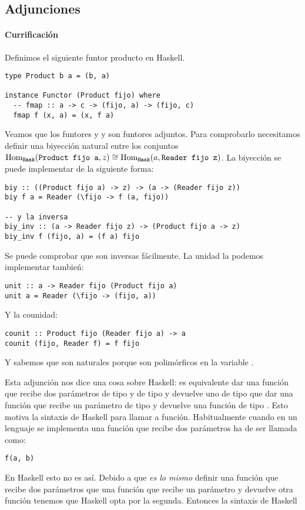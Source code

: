 \subsection{Adjunciones}
\paragraph{Currificación}
Definimos el siguiente funtor producto en Haskell.
\begin{verbatim}
type Product b a = (b, a)

instance Functor (Product fijo) where
  -- fmap :: a -> c -> (fijo, a) -> (fijo, c)
  fmap f (x, a) = (x, f a)
\end{verbatim}

Veamos que los funtores  y y 
son funtores adjuntos. Para comprobarlo necesitamos definir
una biyección natural entre los conjuntos
$\operatorname{Hom}_{\texttt{Hask}}(\texttt{Product fijo a}, z) \cong
\operatorname{Hom}_{\texttt{Hask}}(a, \texttt{Reader fijo z})$. La biyección se puede
implementar de la siguiente forma:
\begin{verbatim}
biy :: ((Product fijo a) -> z) -> (a -> (Reader fijo z))
biy f a = Reader (\fijo -> f (a, fijo))

-- y la inversa
biy_inv :: (a -> Reader fijo z) -> (Product fijo a -> z)
biy_inv f (fijo, a) = (f a) fijo
\end{verbatim}
Se puede comprobar que son inversas fácilmente. La unidad la podemos
implementar tambień:
\begin{verbatim}
unit :: a -> Reader fijo (Product fijo a)
unit a = Reader (\fijo -> (fijo, a))
\end{verbatim}
Y la counidad:
\begin{verbatim}
counit :: Product fijo (Reader fijo a) -> a
counit (fijo, Reader f) = f fijo
\end{verbatim}

Y sabemos que son naturales porque son polimórficos en la variable
.

Esta adjunción nos dice una cosa sobre Haskell: es equivalente
dar una función que recibe dos parámetros de tipo
 y de tipo  y devuelve uno de tipo  que dar
una función que recibe un parámetro de tipo  y devuelve
una función de tipo . Esto motiva la sintaxis de
Haskell para llamar a función. Habitualmente cuando en un lenguaje
se implementa una función  que recibe dos parámetros ha
de ser llamada como:
\begin{verbatim}
f(a, b)
\end{verbatim}
En Haskell esto no es así. Debido a que \textit{es lo mismo} definir
una función que recibe dos parámetros que una función que recibe
un parámetro y devuelve otra función tenemos que Haskell opta por
la segunda. Entonces la sintaxis de Haskell


